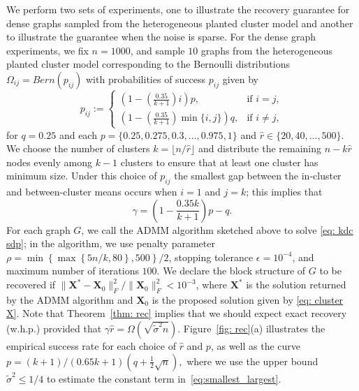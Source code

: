 \documentclass[twoside,11pt]{article}
\newcommand{\bs}{\boldsymbol}
\newcommand{\X}{\bs {X}}
\newcommand{\0}{\bs{0}}
\newcommand{\rbra}[1]{\ensuremath{\left( #1 \right)}} %
\newcommand{\bra}[1]{\ensuremath{\left\{ #1 \right\}}} %
\newcommand{\half}{\frac{1}{2}}
\begin{document}
We perform two sets of experiments, one to illustrate the recovery guarantee for dense graphs sampled from the heterogeneous planted cluster model and another to illustrate the guarantee
when the noise is sparse.
For the dense graph experiments, we fix \(n = 1000\), and sample \(10\) graphs
from the heterogeneous planted cluster model corresponding to the Bernoulli
distributions \(\Omega_{ij} = Bern(p_{ij})\)  with probabilities of success $p_{ij}$ given by
\[
	p_{ij} := \begin{cases} \rbra{ 1 - \rbra{\frac{0.35}{k+1}}i } p, &\text{if } i = j, \\
								\rbra{ 1 - \rbra{\frac{0.35}{k+1}} \min\{i,j\} } q, &\text{if } i \neq j,
							\end{cases}
\]
for $q = 0.25$ and each $p=\{0.25, 0.275, 0.3, \dots, 0.975, 1\}$ and
\(\hat r \in \{20, 40, \dots, 500\}\).
We choose the number of clusters $k=\lfloor n/\hat r \rfloor$
and distribute the remaining $n - k\hat r$ nodes
evenly among $k-1$ clusters to ensure that at least one cluster
has minimum size.
Under this choice of $p_{ij}$ the smallest gap between the in-cluster and between-cluster means occurs when $i=1$ and $j = k$; this implies that
\begin{equation}\label{eq: het gam}
	\gamma = \rbra{ 1 - \frac{0.35 k }{k+1}}p - q.
\end{equation}
For each graph \(G\), we call the ADMM algorithm sketched above to solve \eqref{eq: kdc sdp};
in the algorithm, we use penalty parameter \(\rho = \min \bra{ \max \bra{ 5n/k, 80}, 500}/2 \),
stopping tolerance \(\epsilon = 10^{-4}\), and maximum number of iterations \(100\).
We declare the block structure of \(G\) to be recovered if \(\|\X^* - \X_0\|^2_F / \|\X_0\|^2_F < 10^{-3} \),
where \(\X^* \) is the solution returned by the ADMM algorithm and \(\X_0\) is the proposed solution
given by \eqref{eq: cluster X}.
Note that Theorem~\ref{thm: rec} implies that we should expect exact recovery (w.h.p.) provided that
$
	\gamma \hat r = \Omega\rbra{\sqrt{\tilde \sigma^2n}}.
$
Figure~\ref{fig: rec}(a) illustrates the empirical success rate for each choice of \(\hat r\) and \(p\), as well as the curve \( p =(k+1)/(0.65k + 1)(q + \half {\sqrt{n}}),\) where we use the upper bound $\tilde \sigma^2 \le 1/4$ to estimate the constant term in~\eqref{eq:smallest_largest}.
\end{document}
